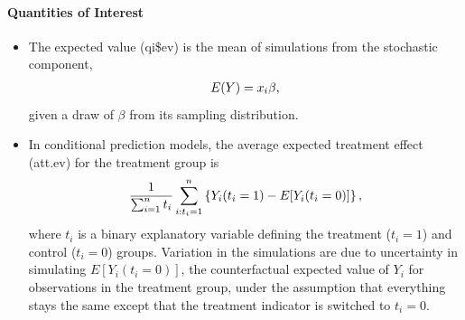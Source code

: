 \documentclass[letterpaper,10pt,english]{sphinxmanual}
\begin{document}
\paragraph{Quantities of Interest}
\label{zelig-ls:quantities-of-interest}\begin{itemize}
\item {} 
The expected value (qi\$ev) is the mean of simulations from the
stochastic component,
\begin{gather}
\begin{split}E(Y) = x_i \beta,\end{split}\notag
\end{gather}
given a draw of \(\beta\) from its sampling distribution.

\item {} 
In conditional prediction models, the average expected treatment
effect (att.ev) for the treatment group is
\begin{gather}
\begin{split}\frac{1}{\sum_{i=1}^n t_i}\sum_{i:t_i=1}^n \left\{ Y_i(t_i=1) -
      E[Y_i(t_i=0)] \right\},\end{split}\notag
\end{gather}
where \(t_i\) is a binary explanatory variable defining the
treatment (\(t_i=1\)) and control (\(t_i=0\)) groups.
Variation in the simulations are due to uncertainty in simulating
\(E[Y_i(t_i=0)]\), the counterfactual expected value of
\(Y_i\) for observations in the treatment group, under the
assumption that everything stays the same except that the treatment
indicator is switched to \(t_i=0\).

\end{itemize}
\end{document}
